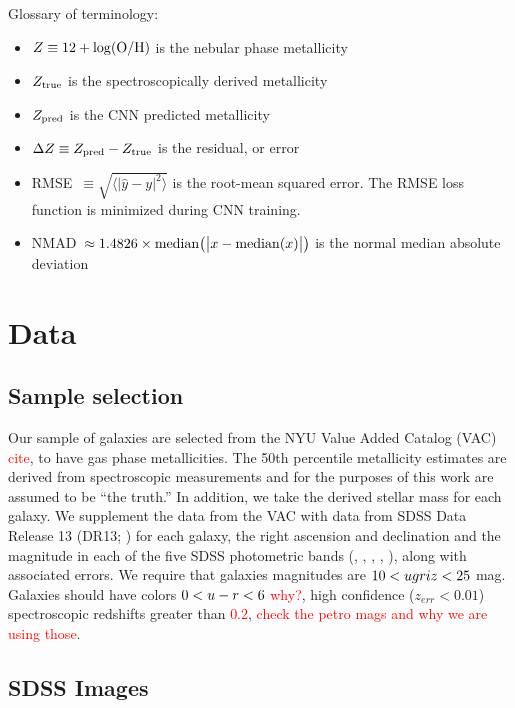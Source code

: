 \documentclass[fleqn,usenatbib]{mnras}
\newcommand{\editorial}[1]{\textcolor{red}{#1}}
\begin{document}
Glossary of terminology:
\begin{itemize}
	\item $Z \equiv 12 + \log ({\rm O/H})$ is the nebular phase metallicity
	\item $Z_{\rm true}$ is the spectroscopically derived metallicity
	\item $Z_{\rm pred}$ is the CNN predicted metallicity
	\item $\Delta Z \equiv Z_{\rm pred} - Z_{\rm true}$ is the residual, or error
	\item RMSE~$\equiv \sqrt{\langle |\hat y - y|^2\rangle}$ is the root-mean squared error. 
	The RMSE loss function is minimized during CNN training.
	\item NMAD~$\approx 1.4826 \times {\rm median} \big (\big|x - {\rm median }(x) \big|\big )$ is the normal median absolute deviation
\end{itemize}


\section{Data} \label{sec:data}

\subsection{Sample selection}

Our sample of galaxies are selected from the NYU Value Added Catalog (VAC) \editorial{cite}, to have gas phase metallicities. The 50th percentile metallicity estimates \citep{Tremonti2004} are derived from spectroscopic measurements and for the purposes of this work are assumed to be ``the truth.'' In addition, we take the derived stellar mass for each galaxy.
We supplement the data from the VAC with data from SDSS Data Release 13 (DR13; \citealt{Albareti2017}) for each galaxy, the right ascension and declination and the magnitude in each of the five SDSS photometric bands (\sdssu, \sdssg, \sdssr, \sdssi, \sdssz), along with associated errors. We require that galaxies magnitudes are $10 < \hbox{$u$}\hbox{$g$}\hbox{$r$}\hbox{$i$}\hbox{$z$} < 25$ mag. Galaxies should have colors $0 < \hbox{$u$}-\hbox{$r$} < 6$ \editorial{why?}, high confidence ($z_{err} < 0.01$) spectroscopic redshifts greater than \editorial{$0.2$}, \editorial{check the petro mags and why we are using those}.

\subsection{SDSS Images}
\end{document}
